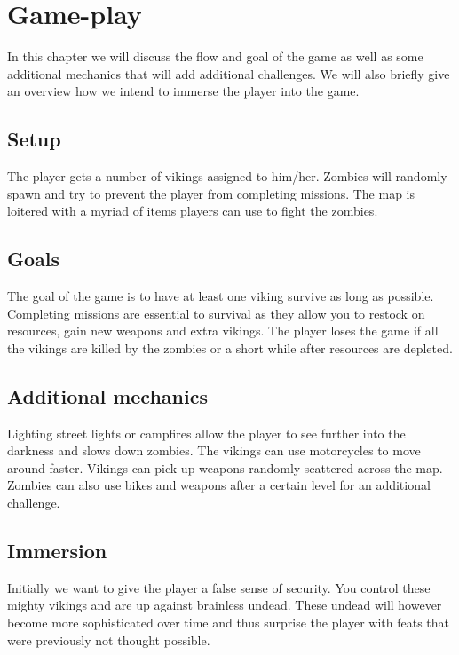 \chapter{Game-play}

In this chapter we will discuss the flow and goal of the game as well as some additional mechanics that will add additional challenges. We will also briefly give an overview how we intend to immerse the player into the game.

\section{Setup}
The player gets a number of vikings assigned to him/her. Zombies will randomly spawn and try to prevent the player from completing missions. The map is loitered with a myriad of items players can use to fight the zombies.

\section{Goals}
The goal of the game is to have at least one viking survive as long as possible. Completing missions are essential to survival as they allow you to restock on resources, gain new weapons and extra vikings. The player loses the game if all the vikings are killed by the zombies or a short while after resources are depleted.

\section{Additional mechanics}
Lighting street lights or campfires allow the player to see further into the darkness and slows down zombies. The vikings can use motorcycles to move around faster. Vikings can pick up weapons randomly scattered across the map. Zombies can also use bikes and weapons after a certain level for an additional challenge.

\section{Immersion}
Initially we want to give the player a false sense of security. You control these mighty vikings and are up against brainless undead. These undead will however become more sophisticated over time and thus surprise the player with feats that were previously not thought possible.
